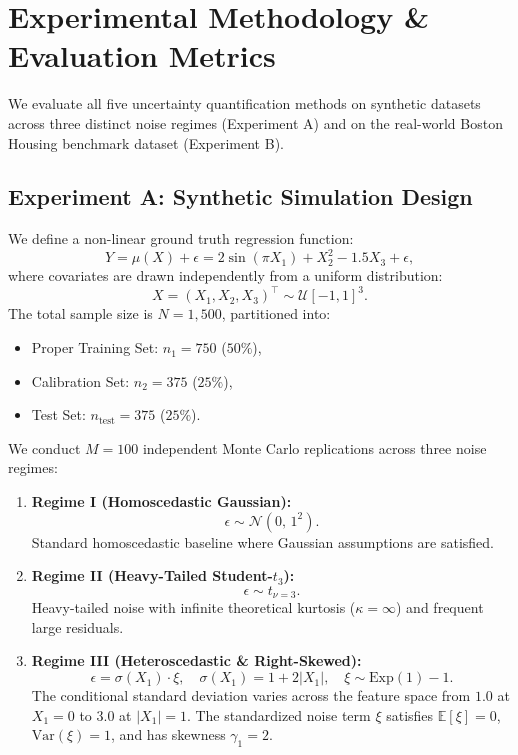 \documentclass[journal]{IEEEtran}
\begin{document}
\section{Experimental Methodology \& Evaluation Metrics}\label{sec:methods}
We evaluate all five uncertainty quantification methods on synthetic datasets across three distinct noise regimes (Experiment A) and on the real-world Boston Housing benchmark dataset (Experiment B).

\subsection{Experiment A: Synthetic Simulation Design}
We define a non-linear ground truth regression function:
\begin{equation}
Y = \mu(X) + \epsilon = 2\sin(\pi X_1) + X_2^2 - 1.5 X_3 + \epsilon,
\end{equation}
where covariates are drawn independently from a uniform distribution:
\begin{equation}
X = (X_1, X_2, X_3)^\top \sim \mathcal{U}[-1, 1]^3.
\end{equation}
The total sample size is $N = 1,500$, partitioned into:
\begin{itemize}
    \item Proper Training Set: $n_1 = 750$ ($50\%$),
    \item Calibration Set: $n_2 = 375$ ($25\%$),
    \item Test Set: $n_{\text{test}} = 375$ ($25\%$).
\end{itemize}

We conduct $M = 100$ independent Monte Carlo replications across three noise regimes:
\begin{enumerate}
    \item \textbf{Regime I (Homoscedastic Gaussian):}
    \begin{equation}
    \epsilon \sim \mathcal{N}(0, \, 1^2).
    \end{equation}
    Standard homoscedastic baseline where Gaussian assumptions are satisfied.
    \item \textbf{Regime II (Heavy-Tailed Student-$t_3$):}
    \begin{equation}
    \epsilon \sim t_{\nu=3}.
    \end{equation}
    Heavy-tailed noise with infinite theoretical kurtosis ($\kappa = \infty$) and frequent large residuals.
    \item \textbf{Regime III (Heteroscedastic \& Right-Skewed):}
    \begin{equation}
    \epsilon = \sigma(X_1) \cdot \xi, \quad \sigma(X_1) = 1 + 2|X_1|, \quad \xi \sim \text{Exp}(1) - 1.
    \end{equation}
    The conditional standard deviation varies across the feature space from $1.0$ at $X_1 = 0$ to $3.0$ at $|X_1| = 1$. The standardized noise term $\xi$ satisfies $\mathbb{E}[\xi] = 0$, $\text{Var}(\xi) = 1$, and has skewness $\gamma_1 = 2$.
\end{enumerate}
\end{document}
